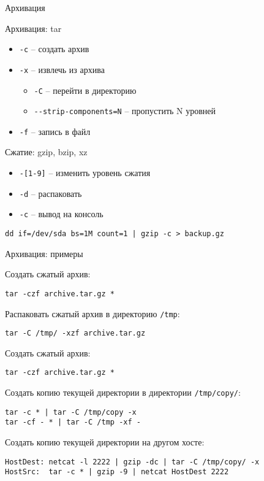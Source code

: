 \begin{frame}[fragile]{Архивация}
	\begin{block}{Архивация: tar}
		\begin{itemize}
			\item {\tt -c} -- создать архив
			\item {\tt -x} -- извлечь из архива
				\begin{itemize}
					\item {\tt -C} -- перейти в директорию
					\item {\tt -{}-strip-components=N} -- пропустить N уровней
				\end{itemize}
			\item {\tt -f} -- запись в файл
		\end{itemize}
	\end{block}

	\begin{block}{Сжатие: gzip, bzip, xz}
		\begin{itemize}
			\item {\tt -[1-9]} -- изменить уровень сжатия
			\item {\tt -d} -- распаковать
			\item {\tt -c} -- вывод на консоль
		\end{itemize}
		\begin{verbatim}
dd if=/dev/sda bs=1M count=1 | gzip -c > backup.gz
		\end{verbatim}
	\end{block}

\end{frame}

\begin{frame}[fragile]{Архивация: примеры}

	Создать сжатый архив:
	\begin{verbatim}
tar -czf archive.tar.gz *
	\end{verbatim}
	\pause
	Распаковать сжатый архив в директорию {\tt /tmp}:
	\begin{verbatim}
tar -C /tmp/ -xzf archive.tar.gz 
	\end{verbatim}
	\pause
	Создать сжатый архив:
	\begin{verbatim}
tar -czf archive.tar.gz *
	\end{verbatim}
	\pause
	Создать копию текущей директории в директории {\tt /tmp/copy/}:
	\begin{verbatim}
tar -c * | tar -C /tmp/copy -x
tar -cf - * | tar -C /tmp -xf -
	\end{verbatim}
	\pause
	Создать копию текущей директории на другом хосте:
	\begin{verbatim}
HostDest: netcat -l 2222 | gzip -dc | tar -C /tmp/copy/ -x
HostSrc:  tar -c * | gzip -9 | netcat HostDest 2222
	\end{verbatim}
\end{frame}
